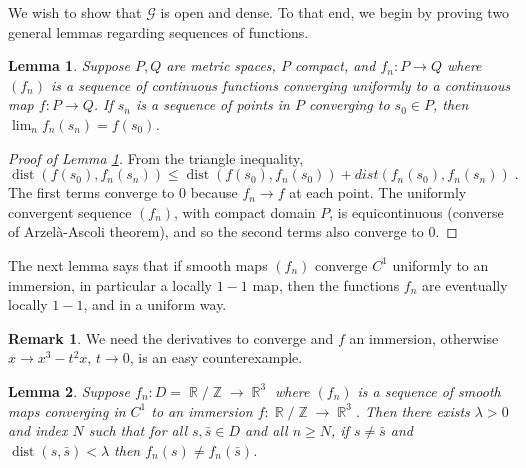 \documentclass[12pt]{article}
\numberwithin{equation}{subsection}
\newtheorem{lem}{Lemma}[thm]
\theoremstyle{definition}
\newtheorem*{rk}{Remark}
\numberwithin{lem}{section}
\DeclareMathOperator{\R}{\mathbb{R}}
\DeclareMathOperator{\Z}{\mathbb{Z}}
\DeclareMathOperator{\dist}{dist}
\def\bs{\bar{s}}
\def\G{\mathcal{G}}
\begin{document}
We wish to show that $\G$ is open and dense.  To that end, we begin by proving two general lemmas regarding sequences of functions.

\begin{lem} \label{lem:fnsn}
Suppose $P,Q$ are metric spaces, $P$ compact, and $f_n:P \to Q$ where $(f_n)$ is a sequence of continuous functions converging uniformly to a continuous map $f:P \to Q$. If $s_n$ is a sequence of points in $P$ converging to $s_0 \in P$, then $\lim_nf_n(s_n)=f(s_0)$.
\end{lem}

\begin{proof}[Proof of Lemma \ref{lem:fnsn}]
From the triangle inequality, $\dist(f(s_0),f_n(s_n)) \leq \dist(f(s_0),f_n(s_0)) + dist(f_n(s_0),f_n(s_n))\;.$ The first terms converge to $0$ because $f_n \rightarrow f$ at each point. The uniformly convergent sequence $(f_n)$, with compact domain $P$, is equicontinuous (converse of Arzel\`{a}-Ascoli theorem), and so the second terms also converge to 0. 
\end{proof}

 The next lemma says that if smooth maps $(f_n)$ converge $C^1$ uniformly to an immersion, in particular a locally $1-1$ map, then the functions $f_n$ are eventually locally $1-1$, and in a uniform way.
 
 \begin{rk} We need the derivatives to converge and $f$ an immersion, otherwise $x \to x^3-t^2x$, $t\to 0$,  is an easy counterexample.
 \end{rk}

\begin{lem} \label{lem:LocallyInjective} Suppose $f_n:D=\R/\Z \to \R^3$ where $(f_n)$ is a sequence of smooth maps converging in $C^1$ to an immersion $f:\R/\Z \to \R^3$. Then there exists $\lambda>0$ and index $N$ such that for all $s, \bs \in D$ and all $n \geq N$, if $s \neq \bs$ and $\mathop{dist}(s, \bs) < \lambda$ then $f_n(s) \neq f_n(\bs)$.
\end{lem}
\end{document}
